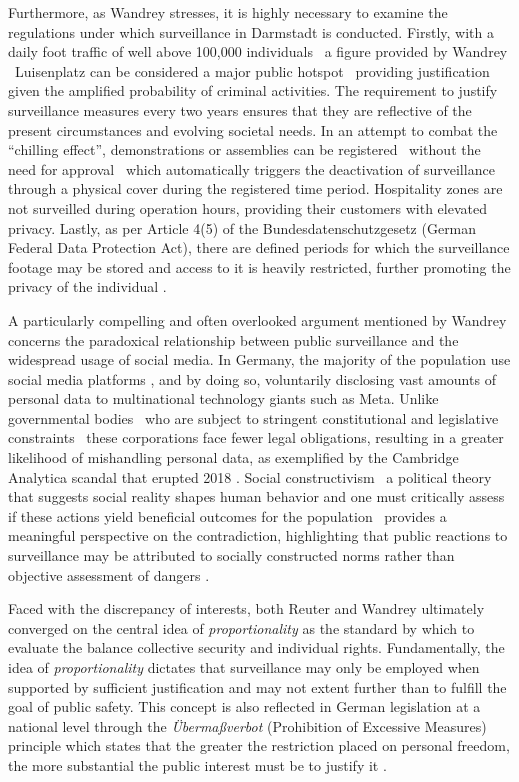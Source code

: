 \documentclass[12pt]{article}
\begin{document}
	Furthermore, as Wandrey stresses, it is highly necessary to examine the regulations under which surveillance in Darmstadt is conducted. Firstly, with a daily foot traffic of well above 100,000 individuals \textemdash\ a figure provided by Wandrey \textemdash\ Luisenplatz can be considered a major public hotspot \textemdash\ providing justification given the amplified probability of criminal activities. The requirement to justify surveillance measures every two years ensures that they are reflective of the present circumstances and evolving societal needs. In an attempt to combat the ``chilling effect'', demonstrations or assemblies can be registered \textemdash\ without the need for approval \textemdash\ which automatically triggers the deactivation of surveillance through a physical cover during the registered time period. Hospitality zones are not surveilled during operation hours, providing their customers with elevated privacy. Lastly, as per Article 4(5) of the Bundesdatenschutzgesetz (German Federal Data Protection Act), there are defined periods for which the surveillance footage may be stored and access to it is heavily restricted, further promoting the privacy of the individual \parencite{gesetzeimInternet_BDSG4}. 
	
	A particularly compelling and often overlooked argument mentioned by Wandrey concerns the paradoxical relationship between public surveillance and the widespread usage of social media. In Germany, the majority of the population use social media platforms \parencite{koptyug2025, worldometer_germany2025}, and by doing so, voluntarily disclosing vast amounts of personal data to multinational technology giants such as Meta. Unlike governmental bodies \textemdash\ who are subject to stringent constitutional and legislative constraints \textemdash\ these corporations face fewer legal obligations, resulting in a greater likelihood of mishandling personal data, as exemplified by the Cambridge Analytica scandal that erupted 2018 \parencite{harbath_cambridge_2023}. Social constructivism \textemdash\ a political theory that suggests social reality shapes human behavior and one must critically assess if these actions yield beneficial outcomes for the population \textemdash\ provides a meaningful perspective on the contradiction, highlighting that public reactions to surveillance may be attributed to socially constructed norms rather than objective assessment of dangers \parencite{courseCompanion2024}. 
	
	Faced with the discrepancy of interests, both Reuter and Wandrey ultimately converged on the central idea of \textit{proportionality} as the standard by which to evaluate the balance collective security and individual rights. Fundamentally, the idea of \textit{proportionality} dictates that surveillance may only be employed when supported by sufficient justification and may not extent further than to fulfill the goal of public safety. This concept is also reflected in German legislation at a national level through the \textit{Übermaßverbot} (Prohibition of Excessive Measures) principle which states that the greater the restriction placed on personal freedom, the more substantial the public interest must be to justify it \parencite{wetzling2023}.
	
\end{document}
